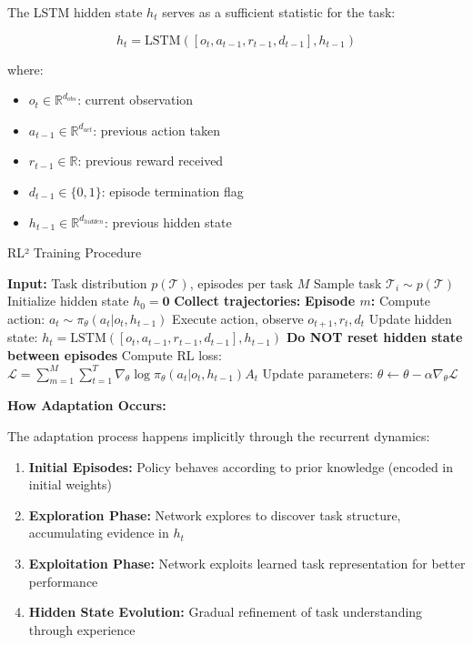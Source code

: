 \documentclass[12pt]{article}
\newcommand{\ieee}[1]{\textcolor{IEEEBlue}{\textbf{#1}}}
\begin{document}
{{			The LSTM hidden state $h_t$ serves as a sufficient statistic for the task:
			
			\begin{equation}
			h_t = \text{LSTM}([o_t, a_{t-1}, r_{t-1}, d_{t-1}], h_{t-1})
			\end{equation}
			
			where:
			\begin{itemize}
				\item $o_t \in \mathbb{R}^{d_{obs}}$: current observation
				\item $a_{t-1} \in \mathbb{R}^{d_{act}}$: previous action taken
				\item $r_{t-1} \in \mathbb{R}$: previous reward received
				\item $d_{t-1} \in \{0, 1\}$: episode termination flag
				\item $h_{t-1} \in \mathbb{R}^{d_{hidden}}$: previous hidden state
			\end{itemize}
			
			\begin{algorithm}[H]
			\caption{RL² Training Procedure}
			\begin{algorithmic}[1]
			\STATE \textbf{Input:} Task distribution $p(\mathcal{T})$, episodes per task $M$
			\STATE Sample task $\mathcal{T}_i \sim p(\mathcal{T})$
			\STATE Initialize hidden state $h_0 = \mathbf{0}$
			\STATE \textbf{Collect trajectories:}
			\STATE \textbf{Episode $m$:}
			\STATE Compute action: $a_t \sim \pi_\theta(a_t | o_t, h_{t-1})$
			\STATE Execute action, observe $o_{t+1}, r_t, d_t$
			\STATE Update hidden state: $h_t = \text{LSTM}([o_t, a_{t-1}, r_{t-1}, d_{t-1}], h_{t-1})$
			\ENDFOR
			\STATE \textbf{Do NOT reset hidden state between episodes}
			\ENDFOR
			\STATE Compute RL loss: $\mathcal{L} = \sum_{m=1}^M \sum_{t=1}^T \nabla_\theta \log \pi_\theta(a_t | o_t, h_{t-1}) A_t$
			\STATE Update parameters: $\theta \leftarrow \theta - \alpha \nabla_\theta \mathcal{L}$
			\ENDWHILE
			\end{algorithmic}
			\end{algorithm}
			
			\ieee{How Adaptation Occurs:}
			
			The adaptation process happens implicitly through the recurrent dynamics:
			
			\begin{enumerate}
				\item \textbf{Initial Episodes:} Policy behaves according to prior knowledge (encoded in initial weights)
				\item \textbf{Exploration Phase:} Network explores to discover task structure, accumulating evidence in $h_t$
				\item \textbf{Exploitation Phase:} Network exploits learned task representation for better performance
				\item \textbf{Hidden State Evolution:} Gradual refinement of task understanding through experience
			\end{enumerate}
			
}}
\end{document}
